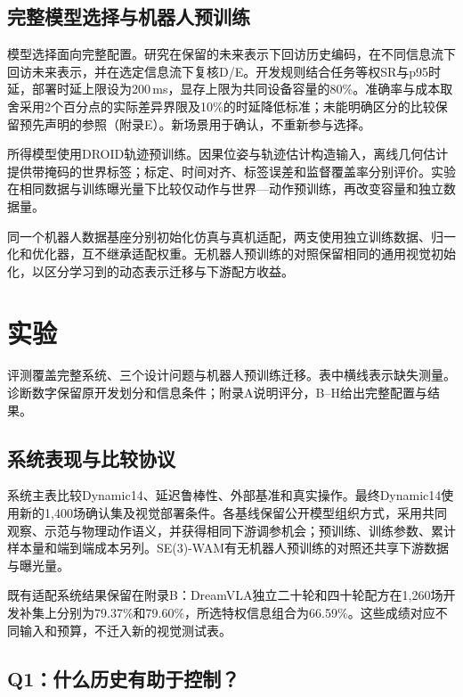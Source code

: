 \subsection{完整模型选择与机器人预训练}

模型选择面向完整配置。研究在保留的未来表示下回访历史编码，在不同信息流下回访未来表示，并在选定信息流下复核D/E。开发规则结合任务等权SR与p95时延，部署时延上限设为200\,ms，显存上限为共同设备容量的80\%。准确率与成本取舍采用2个百分点的实际差异界限及10\%的时延降低标准；未能明确区分的比较保留预先声明的参照（附录E）。新场景用于确认，不重新参与选择。

所得模型使用DROID轨迹预训练\cite{droid}。因果位姿与轨迹估计构造输入，离线几何估计提供带掩码的世界标签；标定、时间对齐、标签误差和监督覆盖率分别评价。实验在相同数据与训练曝光量下比较仅动作与世界—动作预训练，再改变容量和独立数据量。

同一个机器人数据基座分别初始化仿真与真机适配，两支使用独立训练数据、归一化和优化器，互不继承适配权重。无机器人预训练的对照保留相同的通用视觉初始化，以区分学习到的动态表示迁移与下游配方收益。

\section{实验}

评测覆盖完整系统、三个设计问题与机器人预训练迁移。表中横线表示缺失测量。诊断数字保留原开发划分和信息条件；附录A说明评分，B--H给出完整配置与结果。

\subsection{系统表现与比较协议}


系统主表比较Dynamic14、延迟鲁棒性、外部基准和真实操作。最终Dynamic14使用新的1,400场确认集及视觉部署条件。各基线保留公开模型组织方式，采用共同观察、示范与物理动作语义，并获得相同下游调参机会；预训练、训练参数、累计样本量和端到端成本另列。SE(3)-WAM有无机器人预训练的对照还共享下游数据与曝光量。

既有适配系统结果保留在附录B：DreamVLA独立二十轮和四十轮配方在1,260场开发补集上分别为79.37\%和79.60\%，所选特权信息组合为66.59\%。这些成绩对应不同输入和预算，不迁入新的视觉测试表。

\subsection{Q1：什么历史有助于控制？}



